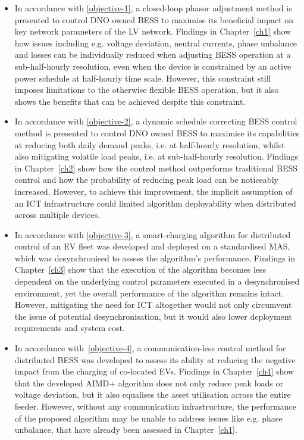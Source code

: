 \begin{itemize}
	\item
	In accordance with \ref{objective-1}, a closed-loop phasor adjustment method is presented to control DNO owned BESS to maximise its beneficial impact on key network parameters of the LV network.
	Findings in Chapter~\ref{ch1} show how issues including e.g. voltage deviation, neutral currents, phase unbalance and losses can be individually reduced when adjusting BESS operation at a sub-half-hourly resolution, even when the device is constrained by an active power schedule at half-hourly time scale.
	However, this constraint still imposes limitations to the otherwise flexible BESS operation, but it also shows the benefits that can be achieved despite this constraint.
	\item
	In accordance with \ref{objective-2}, a dynamic schedule correcting BESS control method is presented to control DNO owned BESS to maximise its capabilities at reducing both daily demand peaks, i.e. at half-hourly resolution, whilst also mitigating volatile load peaks, i.e. at sub-half-hourly resolution.
	Findings in Chapter~\ref{ch2} show how the control method outperforms traditional BESS control and how the probability of reducing peak load can be noticeably increased.
	However, to achieve this improvement, the implicit assumption of an ICT infrastructure could limited algorithm deployability when distributed across multiple devices.
	\item
	In accordance with \ref{objective-3}, a smart-charging algorithm for distributed control of an EV fleet was developed and deployed on a standardised MAS, which was desynchronised to assess the algorithm's performance.
	Findings in Chapter~\ref{ch3} show that the execution of the algorithm becomes less dependent on the underlying control parameters executed in a desynchronised environment, yet the overall performance of the algorithm remains intact.
	However, mitigating the need for ICT altogether would not only circumvent the issue of potential desynchronisation, but it would also lower deployment requirements and system cost.
	\item
	In accordance with \ref{objective-4}, a communication-less control method for distributed BESS was developed to assess its ability at reducing the negative impact from the charging of co-located EVs.
	Findings in Chapter~\ref{ch4} show that the developed AIMD+ algorithm does not only reduce peak loads or voltage deviation, but it also equalises the asset utilisation across the entire feeder.
	However, without any communication infrastructure, the performance of the proposed algorithm may be unable to address issues like e.g. phase unbalance, that have already been assessed in Chapter~\ref{ch1}.
\end{itemize}







